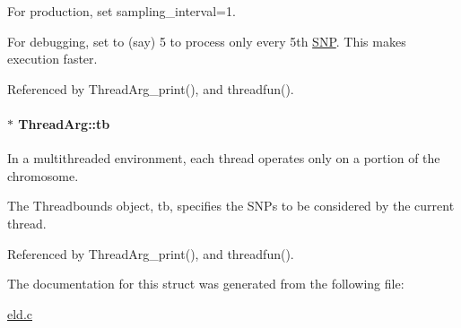 For production, set sampling\-\_\-interval=1. 

For debugging, set to (say) 5 to process only every 5th \hyperlink{struct_s_n_p}{S\-N\-P}. This makes execution faster. 

Referenced by Thread\-Arg\-\_\-print(), and threadfun().

\hypertarget{struct_thread_arg_ac4848e29e694d7a9c5b0b09896cc3f37}{
\paragraph[{tb}]{$\ast$ Thread\-Arg\-::tb}}\label{struct_thread_arg_ac4848e29e694d7a9c5b0b09896cc3f37}


In a multithreaded environment, each thread operates only on a portion of the chromosome. 

The Threadbounds object, tb, specifies the S\-N\-Ps to be considered by the current thread. 

Referenced by Thread\-Arg\-\_\-print(), and threadfun().



The documentation for this struct was generated from the following file\-:\begin{DoxyCompactItemize}
\item 
\hyperlink{eld_8c}{eld.\-c}\end{DoxyCompactItemize}
